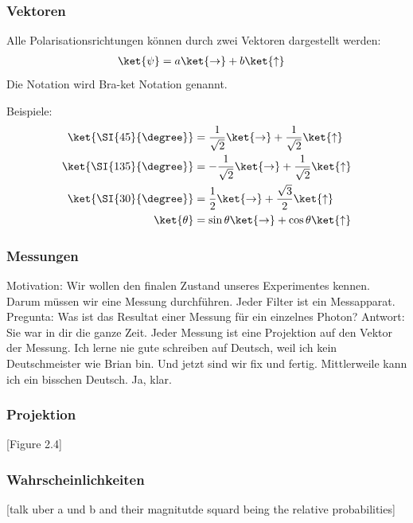 \documentclass{beamer}
\begin{document}
\begin{frame}
\frametitle{Vektoren}
Alle Polarisationsrichtungen können durch zwei Vektoren dargestellt werden:
\begin{align*}
	\ket{\psi} &= a\ket{\to} + b\ket{\uparrow}
\end{align*}
Die Notation wird Bra-ket Notation genannt.

Beispiele:
\begin{align*}
	\ket{\SI{45}{\degree}} &= \frac{1}{\sqrt2}\ket{\to} + \frac{1}{\sqrt2}\ket{\uparrow}
	\\
	\ket{\SI{135}{\degree}} &= -\frac{1}{\sqrt2}\ket{\to} + \frac{1}{\sqrt2}\ket{\uparrow}
	\\
	\ket{\SI{30}{\degree}} &= \frac{1}{2}\ket{\to} + \frac{\sqrt3}{2}\ket{\uparrow}
	\\
	\ket{\theta} &= \sin\theta\ket{\to} + \cos\theta\ket{\uparrow}
\end{align*}
\end{frame}

\begin{frame}
\frametitle{Messungen}
Motivation: Wir wollen den finalen Zustand unseres Experimentes kennen.  Darum m\"ussen wir eine Messung durchf\"uhren.  Jeder Filter ist ein Messapparat.
Pregunta: Was ist das Resultat einer Messung f\"ur ein einzelnes Photon?
Antwort: Sie war in dir die ganze Zeit.  Jeder Messung ist eine Projektion auf den Vektor der Messung.  Ich lerne nie gute schreiben auf Deutsch, weil ich kein Deutschmeister wie Brian bin.
Und jetzt sind wir fix und fertig.  Mittlerweile kann ich ein bisschen Deutsch.  Ja, klar.
\end{frame}

\begin{frame}
\frametitle{Projektion}
[Figure 2.4]
\end{frame}

\begin{frame}
\frametitle{Wahrscheinlichkeiten}
[talk uber a und b and their magnitutde squard being the relative probabilities]
\end{frame}
\end{document}
